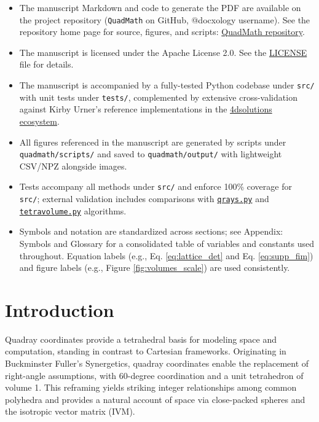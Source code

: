\documentclass[
  10pt,
]{article}
\providecommand{\tightlist}{%
  \setlength{\itemsep}{0pt}\setlength{\parskip}{0pt}}
\begin{document}
\begin{itemize}
\tightlist
\item
  The manuscript Markdown and code to generate the PDF are available on
  the project repository (\texttt{QuadMath} on GitHub, @docxology
  username). See the repository home page for source, figures, and
  scripts: \href{https://github.com/docxology/quadmath}{QuadMath
  repository}.
\item
  The manuscript is licensed under the Apache License 2.0. See the
  \href{../LICENSE}{LICENSE} file for details.
\item
  The manuscript is accompanied by a fully-tested Python codebase under
  \texttt{src/} with unit tests under \texttt{tests/}, complemented by
  extensive cross-validation against Kirby Urner's reference
  implementations in the
  \href{https://github.com/4dsolutions}{4dsolutions ecosystem}.
\item
  All figures referenced in the manuscript are generated by scripts
  under \texttt{quadmath/scripts/} and saved to
  \texttt{quadmath/output/} with lightweight CSV/NPZ alongside images.
\item
  Tests accompany all methods under \texttt{src/} and enforce 100\%
  coverage for \texttt{src/}; external validation includes comparisons
  with
  \href{https://github.com/4dsolutions/m4w/blob/main/qrays.py}{\texttt{qrays.py}}
  and
  \href{https://github.com/4dsolutions/m4w/blob/main/tetravolume.py}{\texttt{tetravolume.py}}
  algorithms.
\item
  Symbols and notation are standardized across sections; see Appendix:
  Symbols and Glossary for a consolidated table of variables and
  constants used throughout. Equation labels (e.g., Eq.
  \eqref{eq:lattice_det} and Eq. \eqref{eq:supp_fim}) and figure labels
  (e.g., Figure \ref{fig:volumes_scale}) are used consistently. 
\end{itemize}

\hypertarget{introduction}{%
\section{Introduction}\label{introduction}}

Quadray coordinates provide a tetrahedral basis for modeling space and
computation, standing in contrast to Cartesian frameworks. Originating
in Buckminster Fuller's Synergetics, quadray coordinates enable the
replacement of right-angle assumptions, with 60-degree coordination and
a unit tetrahedron of volume 1. This reframing yields striking integer
relationships among common polyhedra and provides a natural account of
space via close-packed spheres and the isotropic vector matrix (IVM).
\end{document}
